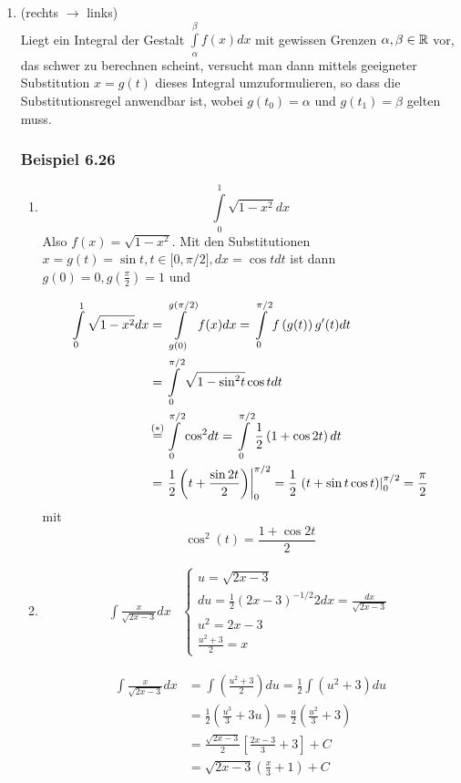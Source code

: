 \begin{enumerate}
\begin{enumerate}
\end{enumerate}
\item (rechts $\to$ links)\\
Liegt ein Integral der Gestalt $\int\limits_\alpha ^\beta  {f(x)dx}$ mit gewissen Grenzen $\alpha,\beta\in\mathbb{R}$ vor, das schwer zu berechnen scheint, versucht man dann mittels geeigneter Substitution $x=g(t)$ dieses Integral umzuformulieren, so dass die Substitutionsregel anwendbar ist, wobei $g(t_0)=\alpha$ und $g(t_1)=\beta$ gelten muss.
\subsubsection*{Beispiel 6.26}
\begin{enumerate}
\item \[\int\limits_0^1 {\sqrt {1 - {x^2}} dx} \] Also $f(x)=\sqrt{1-x^2}$. Mit den Substitutionen $x=g(t)=\sin t, t\in \lbrack 0,\pi/2\rbrack, dx=\cos tdt$ ist dann $g(0)=0, g\left(\frac{\pi}{2}\right)=1$ und

\begin{align*}
\int\limits_0^1 {\sqrt {1 - {x^2}} } dx &=\int\limits_{g(0)}^{g(\pi /2)} {f(x)dx = \int\limits_0^{\pi /2} {f\left( {g(t)} \right)g'(t)dt} } \\
 &=\int\limits_0^{\pi /2} {\sqrt {1 - {{\sin }^2}t}} \cos tdt\mathop {\rm{  }}\\
&\mathop= \limits^{( * )} \int\limits_0^{\pi /2} {{{\cos }^2}dt}  = \int\limits_0^{\pi /2} {\frac{1}{2}\left( {1 + \cos 2t} \right)dt} \\
&=\left. {\frac{1}{2}\left( {t + \frac{{\sin 2t}}{2}} \right)} \right|_0^{\pi /2} = \frac{1}{2}\left. {\left( {t + \sin t\cos t} \right)} \right|_0^{\pi /2} = \frac{\pi }{2}
\end{align*}
mit
\[
{\cos ^2}(t) = \frac{{1 + \cos 2t}}{2} \tag{\textasteriskcentered}
\]

\item \[\begin{array}{*{20}{c}}
{\int {\frac{x}{{\sqrt {2x - 3} }}dx} }&{\left\{ {\begin{array}{*{20}{l}}
{u = \sqrt {2x - 3} }\\
{du = \frac{1}{2}{{\left( {2x - 3} \right)}^{ - 1/2}}2dx = \frac{{dx}}{{\sqrt {2x - 3} }}}\\
{{u^2} = 2x - 3}\\
{\frac{{{u^2} + 3}}{2} = x}
\end{array}} \right.}
\end{array}\]

\begin{align*}
\int {\frac{x}{{\sqrt {2x - 3} }}dx}  &=\int {\left( {\frac{{{u^2} + 3}}{2}} \right)} du = \frac{1}{2}\int {({u^2} + 3)du} \\
&= \frac{1}{2}\left( {\frac{{{u^3}}}{3} + 3u} \right) = \frac{u}{2}\left( {\frac{{{u^2}}}{3} + 3} \right)\\
&= \frac{{\sqrt {2x - 3} }}{2}\left[ {\frac{{2x - 3}}{3} + 3} \right] + C\\
&= \sqrt {2x - 3} \left( {\frac{x}{3} + 1} \right) + C
\end{align*}
\end{enumerate}

\end{enumerate}
